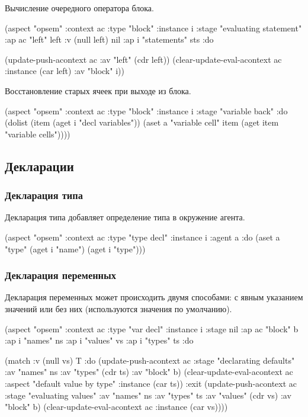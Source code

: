 \documentclass[12pt,twoside,russian]{article}
\begin{document}
Вычисление очередного оператора блока.

\begin{ABMLCode}
(aspect "opsem" :context ac :type "block" :instance i 
  :stage "evaluating statement" :ap ac "left" left 
  :v (null left) nil :ap i "statements" sts :do 
  
  (update-push-acontext ac :av "left" (cdr left))
  (clear-update-eval-acontext ac :instance (car left) :av "block" i))
\end{ABMLCode}

Восстановление старых ячеек при выходе из блока.

\begin{ABMLCode}
(aspect "opsem" :context ac :type "block" :instance i 
  :stage "variable back" :do 
  (dolist (item (aget i "decl variables")) 
          (aset a "variable cell" item (aget item "variable cells"))))
\end{ABMLCode}


\subsection{Декларации}

\subsubsection{Декларация типа}
Декларация типа добавляет определение типа в окружение агента.

\begin{ABMLCode}
(aspect "opsem" :context ac :type "type decl" :instance i :agent a 
:do (aset a "type" (aget i "name") (aget i "type")))
\end{ABMLCode}

\subsubsection{Декларация переменных}
Декларация переменных может происходить двумя способами: с явным указанием значений или без них (используются значения по умолчанию).

\begin{ABMLCode}
(aspect "opsem" :context ac :type "var decl" :instance i 
  :stage nil :ap ac "block" b :ap i "names" ns :ap i "values" vs 
  :ap i "types" ts :do 
  
  (match :v (null vs) T 
  :do 
  (update-push-acontext ac :stage "declarating defaults" 
    :av "names" ns :av "types" (cdr ts) :av "block" b)
  (clear-update-eval-acontext ac :aspect "default value by type" 
    :instance (car ts))
  :exit 
  (update-push-acontext ac :stage "evaluating values" :av "names" ns 
    :av "types" ts :av "values" (cdr vs) :av "block" b)
  (clear-update-eval-acontext ac :instance (car vs))))
\end{ABMLCode}
\end{document}
